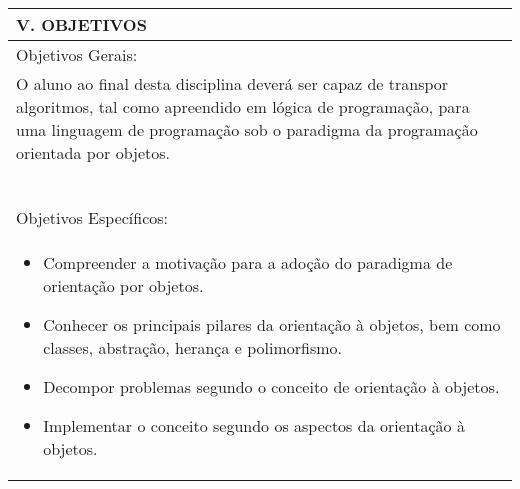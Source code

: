 \documentclass[12pt]{article}
\begin{document}
\begin{longtable}{|L{1.025\textwidth}|} \hline
%
{\bf V. OBJETIVOS } \\ \hline
%
Objetivos Gerais:\\
 O aluno ao final desta disciplina deverá ser capaz de transpor algoritmos, tal como apreendido em lógica de programação, para uma linguagem de programação sob o paradigma da programação orientada por objetos.
\\
\\
\\
\\
\\
\\
\\
Objetivos Específicos:\\
\begin{itemize}
\item Compreender a motivação para a adoção do paradigma de orientação por objetos. 
\item Conhecer os principais pilares da orientação à objetos, bem como classes, abstração, herança e polimorfismo. 
\item Decompor problemas segundo o conceito de orientação à objetos. 
\item Implementar o conceito segundo os aspectos da orientação à objetos.
\end{itemize}

\\ \hline
\end{longtable}
\end{document}
